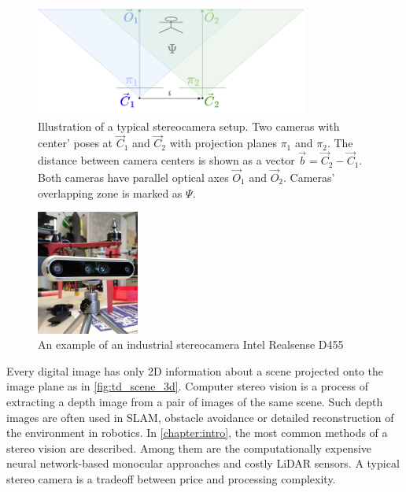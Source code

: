 \begin{figure}[ht]
    \centering
    \includegraphics[width=0.8\textwidth]{graphics/stereopair.png}
    \caption[Illustration of a typical stereocamera setup.]{Illustration of a typical stereocamera setup. Two cameras with center' poses at $\vec{C}_1$ and $\vec{C}_2$ with projection planes $\pi_1$ and $\pi_2$.
    The distance between camera centers is shown as a vector $\vec{b} = \vec{C}_2 - \vec{C}_1$. 
    Both cameras have parallel optical axes $\vec{O}_1$ and $\vec{O}_2$. 
    Cameras' overlapping zone is marked as $\Psi$.}
    \label{fig:sch_stereo}
\end{figure}
\begin{figure}[ht]
    \centering
    \includegraphics[width=0.3\textwidth]{graphics/stereo_example.jpg}
    \caption[An example of an industrial stereocamera.]{An example of an industrial stereocamera Intel Realsense D455}
    \label{fig:inteld455}
\end{figure}

Every digital image has only 2D information about a scene projected onto the image plane as in \autoref{fig:td_scene_3d}.
Computer stereo vision is a process of extracting a depth image from a pair of images of the same scene. 
Such depth images are often used in SLAM, obstacle avoidance or detailed reconstruction of the environment in robotics.
In \autoref{chapter:intro}, the most common methods of a stereo vision are described.
Among them are the computationally expensive neural network-based monocular approaches and costly LiDAR sensors.
A typical stereo camera is a tradeoff between price and processing complexity.

